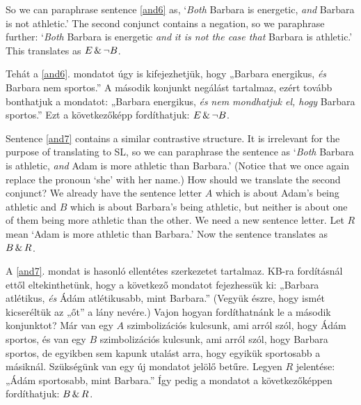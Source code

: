 So we can paraphrase sentence \ref{and6} as, `\emph{Both} Barbara is energetic, \emph{and} Barbara is not athletic.' The second conjunct contains a negation, so we paraphrase further: `\emph{Both} Barbara is energetic \emph{and} \emph{it is not the case that} Barbara is athletic.' This translates as $E\,\&\,\neg B$.

Tehát a \ref{and6}. mondatot úgy is kifejezhetjük, hogy „Barbara energikus, \emph{és} Barbara nem sportos.” A második konjunkt negálást tartalmaz, ezért tovább bonthatjuk a mondatot: „Barbara energikus, \emph{és} \emph{nem mondhatjuk el, hogy} Barbara sportos.” Ezt a következőképp fordíthatjuk: $E\,\&\,\neg B$.

Sentence \ref{and7} contains a similar contrastive structure. It is irrelevant for the purpose of translating to SL, so we can paraphrase the sentence as `\emph{Both} Barbara is athletic, \emph{and} Adam is more athletic than Barbara.' (Notice that we once again replace the pronoun `she' with her name.) How should we translate the second conjunct? We already have the sentence letter $A$ which is about Adam's being athletic and $B$ which is about Barbara's being athletic, but neither is about one of them being more athletic than the other. We need a new sentence letter. Let $R$ mean `Adam is more athletic than Barbara.' Now the sentence translates as $B\,\&\, R$.

A \ref{and7}. mondat is hasonló ellentétes szerkezetet tartalmaz. KB-ra fordításnál ettől eltekinthetünk, hogy a következő mondatot fejezhessük ki: „Barbara atlétikus, \emph{és} Ádám atlétikusabb, mint Barbara.” (Vegyük észre, hogy ismét kicseréltük az „őt” a lány nevére.) Vajon hogyan fordíthatnánk le a második konjunktot? Már van egy $A$ szimbolizációs kulcsunk, ami arról szól, hogy Ádám sportos, és van egy $B$ szimbolizációs kulcsunk, ami arról szól, hogy Barbara sportos, de egyikben sem kapunk utalást arra, hogy egyikük sportosabb a másiknál. Szükségünk van egy új mondatot jelölő betűre. Legyen $R$ jelentése: „Ádám sportosabb, mint Barbara.” Így pedig a mondatot a következőképpen fordíthatjuk: $B\,\&\, R$.



